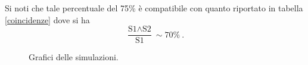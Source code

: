 Si noti che tale percentuale del 75\% è compatibile con quanto riportato in tabella \ref{coincidenze} dove si ha
\[\frac{\text{S1}\wedge\text{S2}}{\text{S1}}\sim70\%\ .\]

\begin{figure}[h]
	\centerline{
	}
	\centerline{} 
	\caption{Grafici delle simulazioni.}
	\label{nDsim_plots}
\end{figure}

